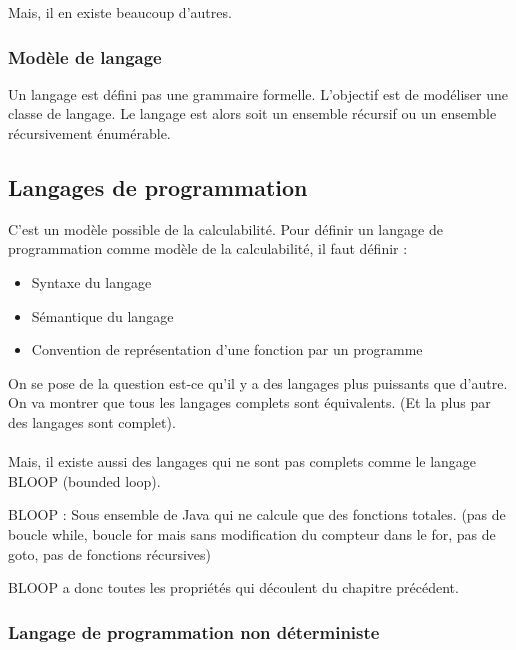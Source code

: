 Mais, il en existe beaucoup d'autres.

\subsubsection{Modèle de langage}
\label{ssub:mod_le_de_langage}
Un langage est défini pas une grammaire formelle. L'objectif est de modéliser 
une classe de langage. Le langage est alors soit un ensemble récursif ou un 
ensemble récursivement énumérable.


\subsection{Langages de programmation}
\label{sub:langages_de_programmation}
C'est un modèle possible de la calculabilité. Pour définir un langage de 
programmation comme modèle de la calculabilité, il faut définir : 
\begin{itemize}
	\item Syntaxe du langage
	\item Sémantique du langage
	\item Convention de représentation d'une fonction par un programme
\end{itemize}

On se pose de la question est-ce qu'il y a des langages plus puissants que 
d'autre. On va montrer que tous les langages complets sont équivalents. (Et la 
plus par des langages sont complet).

\paragraph{} Mais, il existe aussi des langages qui ne sont pas complets comme le 
langage BLOOP (bounded loop).

\begin{mydef}
	BLOOP : Sous ensemble de Java qui ne calcule que des fonctions totales. 
	(pas de boucle while, boucle for mais sans modification du compteur 
	dans le for, pas de goto, pas de fonctions récursives)
\end{mydef}

BLOOP a donc toutes les propriétés qui découlent du chapitre précédent.


\subsubsection{Langage de programmation non déterministe}
\label{ssub:langague_de_programmation_non_d_terministe}

